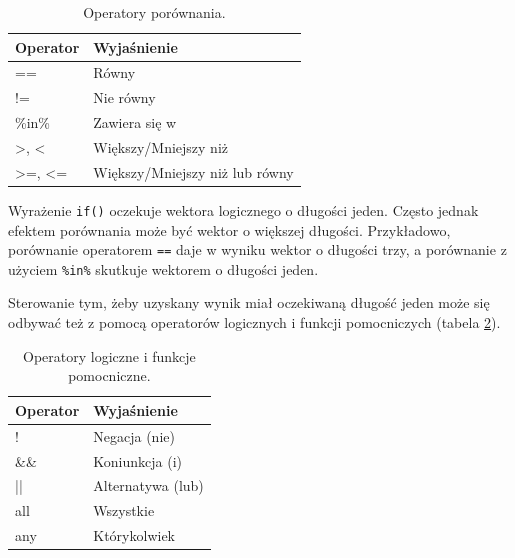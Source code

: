 \documentclass[paper=6in:9in,pagesize=pdftex,headinclude=on,footinclude=on,10pt]{scrbook}
\newenvironment{Shaded}{\begin{snugshade}}{\end{snugshade}}
\newcommand{\CommentTok}[1]{\textcolor[rgb]{0.56,0.35,0.01}{\textit{#1}}}
\newcommand{\DecValTok}[1]{\textcolor[rgb]{0.00,0.00,0.81}{#1}}
\newcommand{\KeywordTok}[1]{\textcolor[rgb]{0.13,0.29,0.53}{\textbf{#1}}}
\newcommand{\NormalTok}[1]{#1}
\newcommand{\OperatorTok}[1]{\textcolor[rgb]{0.81,0.36,0.00}{\textbf{#1}}}
\newcommand{\StringTok}[1]{\textcolor[rgb]{0.31,0.60,0.02}{#1}}
\begin{document}
\begin{table}[t]

\caption{\label{tab:operators}Operatory porównania.}
\centering
\begin{tabular}{ll}
\toprule
Operator & Wyjaśnienie\\
\midrule
== & Równy\\
!= & Nie równy\\
\%in\% & Zawiera się w\\
>, < & Większy/Mniejszy niż\\
>=, <= & Większy/Mniejszy niż lub równy\\
\bottomrule
\end{tabular}
\end{table}

Wyrażenie \texttt{if()} oczekuje wektora logicznego o długości jeden.
Często jednak efektem porównania może być wektor o większej długości.
Przykładowo, porównanie operatorem \texttt{==} daje w wyniku wektor o długości trzy, a porównanie z użyciem \texttt{\%in\%} skutkuje wektorem o długości jeden.

\begin{Shaded}
\end{Shaded}

Sterowanie tym, żeby uzyskany wynik miał oczekiwaną długość jeden może się odbywać też z pomocą operatorów logicznych i funkcji pomocniczych (tabela \ref{tab:operators2}).

\begin{table}[t]

\caption{\label{tab:operators2}Operatory logiczne i funkcje pomocniczne.}
\centering
\begin{tabular}{ll}
\toprule
Operator & Wyjaśnienie\\
\midrule
! & Negacja (nie)\\
\&\& & Koniunkcja (i)\\
|| & Alternatywa (lub)\\
all & Wszystkie\\
any & Którykolwiek\\
\bottomrule
\end{tabular}
\end{table}
\end{document}
